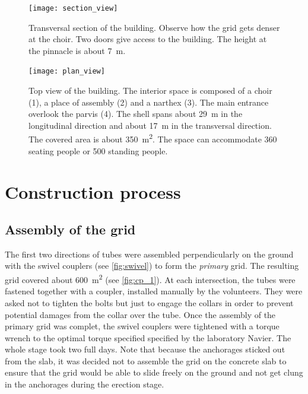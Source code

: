 \begin{figure}[p]
	\captionsetup[subfloat]{captionskip=20pt}
     	\centering
	\begin{fullpage}	
		\texttt{[image: section\_view]}
		\caption[Transversal section of the building]{Transversal section of the building. Observe how the grid gets denser at the choir. Two doors give access to the building. The height at the pinnacle is about 7~m.}
		\label{fig:sec}
		\vspace{1.5cm}
		\texttt{[image: plan\_view]}
		\caption[Top view of the building]{Top view of the building. The interior space is composed of a choir (1), a place of assembly (2) and a narthex (3). The main entrance overlook the parvis (4). The shell spans about 29~m in the longitudinal direction and about 17~m in the transversal direction. The covered area is about 350~m\textsuperscript{2}. The space can accommodate 360 seating people or 500 standing people.}
		\label{fig:plan_view}	
	\end{fullpage}
\end{figure}

\clearpage


\section{Construction process}

\subsection{Assembly of the grid}
The first two directions of tubes were assembled perpendicularly on the ground with the swivel couplers (see \cref{fig:swivel}) to form the \emph{primary} grid. The resulting grid covered about 600~m\textsuperscript{2} (see \cref{fig:cp_1}). At each intersection, the tubes were fastened together with a coupler, installed manually by the volunteers. They were asked not to tighten the bolts but just to engage the collars in order to prevent potential damages from the collar over the tube. Once the assembly of the primary grid was complet, the swivel couplers were tightened with a torque wrench to the optimal torque specified specified by the laboratory Navier. The whole stage took two full days. Note that because the anchorages sticked out from the slab, it was decided not to assemble the grid on the concrete slab to ensure that the grid would be able to slide freely on the ground and not get clung in the anchorages during the erection stage.

